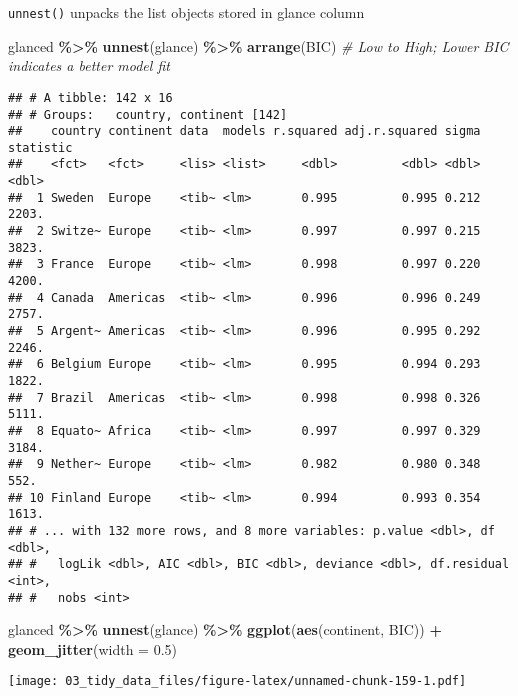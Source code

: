 \documentclass[
]{book}
\newenvironment{Shaded}{\begin{snugshade}}{\end{snugshade}}
\newcommand{\CommentTok}[1]{\textcolor[rgb]{0.56,0.35,0.01}{\textit{#1}}}
\newcommand{\DataTypeTok}[1]{\textcolor[rgb]{0.13,0.29,0.53}{#1}}
\newcommand{\FloatTok}[1]{\textcolor[rgb]{0.00,0.00,0.81}{#1}}
\newcommand{\KeywordTok}[1]{\textcolor[rgb]{0.13,0.29,0.53}{\textbf{#1}}}
\newcommand{\NormalTok}[1]{#1}
\newcommand{\OperatorTok}[1]{\textcolor[rgb]{0.81,0.36,0.00}{\textbf{#1}}}
\newcommand{\StringTok}[1]{\textcolor[rgb]{0.31,0.60,0.02}{#1}}
\begin{document}
\texttt{unnest()} unpacks the list objects stored in glance column

\begin{Shaded}
\begin{Highlighting}[]
\NormalTok{glanced }\OperatorTok{\%\textgreater{}\%}
\StringTok{  }\KeywordTok{unnest}\NormalTok{(glance) }\OperatorTok{\%\textgreater{}\%}
\StringTok{  }\KeywordTok{arrange}\NormalTok{(BIC) }\CommentTok{\# Low to High; Lower BIC indicates a better model fit}
\end{Highlighting}
\end{Shaded}

\begin{verbatim}
## # A tibble: 142 x 16
## # Groups:   country, continent [142]
##    country continent data  models r.squared adj.r.squared sigma statistic
##    <fct>   <fct>     <lis> <list>     <dbl>         <dbl> <dbl>     <dbl>
##  1 Sweden  Europe    <tib~ <lm>       0.995         0.995 0.212     2203.
##  2 Switze~ Europe    <tib~ <lm>       0.997         0.997 0.215     3823.
##  3 France  Europe    <tib~ <lm>       0.998         0.997 0.220     4200.
##  4 Canada  Americas  <tib~ <lm>       0.996         0.996 0.249     2757.
##  5 Argent~ Americas  <tib~ <lm>       0.996         0.995 0.292     2246.
##  6 Belgium Europe    <tib~ <lm>       0.995         0.994 0.293     1822.
##  7 Brazil  Americas  <tib~ <lm>       0.998         0.998 0.326     5111.
##  8 Equato~ Africa    <tib~ <lm>       0.997         0.997 0.329     3184.
##  9 Nether~ Europe    <tib~ <lm>       0.982         0.980 0.348      552.
## 10 Finland Europe    <tib~ <lm>       0.994         0.993 0.354     1613.
## # ... with 132 more rows, and 8 more variables: p.value <dbl>, df <dbl>,
## #   logLik <dbl>, AIC <dbl>, BIC <dbl>, deviance <dbl>, df.residual <int>,
## #   nobs <int>
\end{verbatim}

\begin{Shaded}
\begin{Highlighting}[]
\NormalTok{glanced }\OperatorTok{\%\textgreater{}\%}
\StringTok{  }\KeywordTok{unnest}\NormalTok{(glance) }\OperatorTok{\%\textgreater{}\%}
\StringTok{  }\KeywordTok{ggplot}\NormalTok{(}\KeywordTok{aes}\NormalTok{(continent, BIC)) }\OperatorTok{+}
\StringTok{  }\KeywordTok{geom\_jitter}\NormalTok{(}\DataTypeTok{width =} \FloatTok{0.5}\NormalTok{)}
\end{Highlighting}
\end{Shaded}

\texttt{[image: 03\_tidy\_data\_files/figure-latex/unnamed-chunk-159-1.pdf]}
\end{document}
